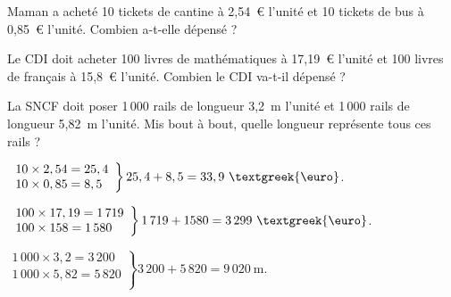\begin{myenumerate}
  \item Maman a acheté 10 tickets de cantine à 2,54~\textgreek{\euro}
    l'unité et 10 tickets de bus à 0,85~\textgreek{\euro}
    l'unité. Combien a-t-elle dépensé ?
  \item Le CDI doit acheter 100 livres de mathématiques à
    17,19~\textgreek{\euro} l'unité et 100 livres de français à
    15,8~\textgreek{\euro} l'unité. Combien le CDI va-t-il dépensé ?
  \item La SNCF doit poser 1\,000 rails de longueur 3,2~m l'unité et
    1\,000 rails de longueur 5,82~m l'unité. Mis bout à bout, quelle
    longueur représente tous ces rails ?
\end{myenumerate}
\begin{multicols}{2}
\begin{myenumerate}
  \item\hfill\newline $\left.
      \begin{array}{l}
        10\times2,54=25,4\\
        10\times0,85=8,5\\
      \end{array}
      \right\}25,4+8,5=33,9~\mbox{\textgreek{\euro}}$.
    \item\hfill\newline$\left.
      \begin{array}{l}
        100\times17,19=1\,719\\
        100\times158=1\,580\\
      \end{array}
      \right\}1\,719+1580=3\,299~\mbox{\textgreek{\euro}}$.\par\columnbreak\par
    \item\hfill\newline$\left.
      \begin{array}{l}
        1\,000\times3,2=3\,200\\
        1\,000\times5,82=5\,820\\
      \end{array}
      \right\}3\,200+5\,820=9\,020~\mbox{m}$.
\end{myenumerate}
\end{multicols}